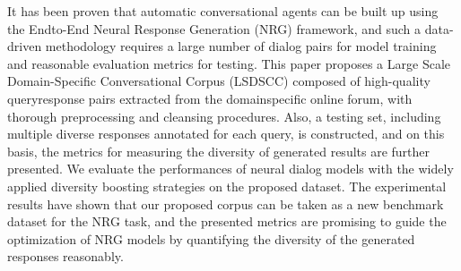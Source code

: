 It has been proven that automatic conversational agents can be built up using the Endto-End Neural Response Generation (NRG) framework, and such a data-driven methodology requires a large number of dialog pairs for model training and reasonable evaluation metrics for testing. This paper proposes a Large Scale Domain-Specific Conversational Corpus (LSDSCC) composed of high-quality queryresponse pairs extracted from the domainspecific online forum, with thorough preprocessing and cleansing procedures. Also, a testing set, including multiple diverse responses annotated for each query, is constructed, and on this basis, the metrics for measuring the diversity of generated results are further presented. We evaluate the performances of neural dialog models with the widely applied diversity boosting strategies on the proposed dataset. The experimental results have shown that our proposed corpus can be taken as a new benchmark dataset for the NRG task, and the presented metrics are promising to guide the optimization of NRG models by quantifying the diversity of the generated responses reasonably.
